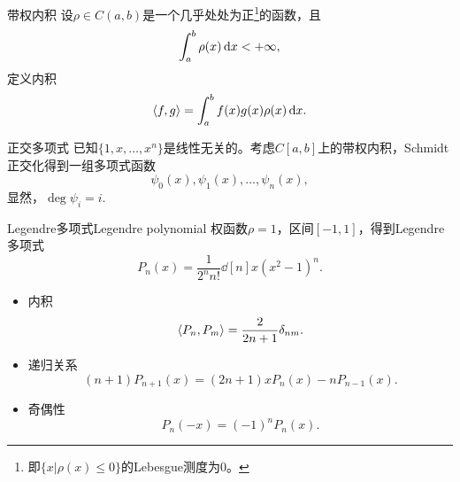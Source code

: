 \begin{definition}
    {带权内积}{}
    设$\rho\in C(a,b)$是一个几乎处处为正\footnote{即$\{x|\rho(x)\leq 0\}$的Lebesgue测度为0。}的函数，且
    \[
        \int_a^b\rho(x)\mathop{}\!\mathrm{d} x<+\infty,
    \]
    定义内积
    \begin{equation}
        \left\langle f,g\right\rangle=\int_a^bf(x)g(x)\rho(x)\mathop{}\!\mathrm{d} x.
    \end{equation}
\end{definition}

\begin{definition}
    {正交多项式}{}
    已知$\{1,x,\ldots,x^n\}$是线性无关的。考虑$C[a,b]$上的带权内积，Schmidt正交化得到一组多项式函数
    \[
        \psi_0(x),\psi_1(x),\ldots,\psi_n(x),
    \]
    显然，$\deg\psi_i=i.$
\end{definition}

\begin{example}
    {Legendre多项式}{Legendre polynomial}
    权函数$\rho=1$，区间$[-1,1]$，得到Legendre多项式
    \begin{equation}
        P_n(x)=\frac1{2^nn!}\dd[n]x(x^2-1)^n.
    \end{equation}
    \begin{itemize}
        \item 内积 
        \begin{equation}
            \left\langle P_n,P_m\right\rangle=\frac2{2n+1}\delta_{nm}.
        \end{equation}
        \item 递归关系
        \begin{equation}
            (n+1)P_{n+1}(x)=(2n+1)xP_n(x)-nP_{n-1}(x).
        \end{equation}
        \item 奇偶性
        \begin{equation}
            P_n(-x)=(-1)^nP_n(x).
        \end{equation}
    \end{itemize}
\end{example}

